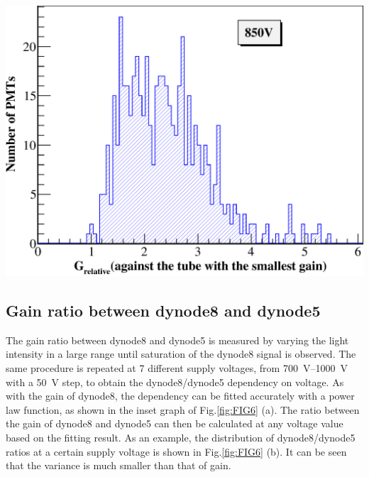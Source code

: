 \documentclass[a4paper,10pt,twoside]{cpc-hepnp}
\begin{document}
\begin{CJK*}{UTF8}{gbsn}
\begin{multicols}{2}
\begin{center}
	\includegraphics[width=\linewidth]{FIG5}
\end{center}

\subsection{Gain ratio between dynode8 and dynode5}
\label{sec:psd_dy58}

The gain ratio between dynode8 and dynode5 is measured by varying the light intensity in a large range until saturation of the dynode8 signal is observed.
The same procedure is repeated at 7 different supply voltages, from \SIrange{700}{1000}{\volt} with a \SI{50}{\volt} step, to obtain the dynode8/dynode5 dependency on voltage.
As with the gain of dynode8, the dependency can be fitted accurately with a power law function, as shown in the inset graph of Fig.\ref{fig:FIG6} (a).
The ratio between the gain of dynode8 and dynode5 can then be calculated at any voltage value based on the fitting result.
As an example, the distribution of dynode8/dynode5 ratios at a certain supply voltage is shown in Fig.\ref{fig:FIG6} (b).
It can be seen that the variance is much smaller than that of gain.


\end{multicols}
\end{CJK*}
\end{document}
